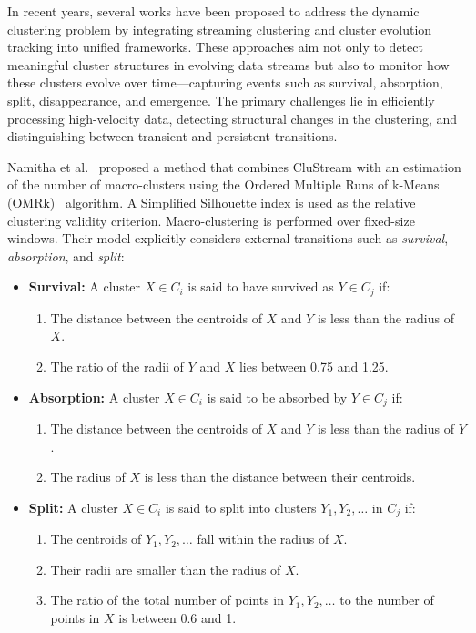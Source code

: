 In recent years, several works have been proposed to address the dynamic
clustering problem by integrating streaming clustering and cluster evolution
tracking into unified frameworks. These approaches aim not only to detect
meaningful cluster structures in evolving data streams but also to monitor how
these clusters evolve over time—capturing events such as survival, absorption,
split, disappearance, and emergence. The primary challenges lie in efficiently
processing high-velocity data, detecting structural changes in the clustering,
and distinguishing between transient and persistent transitions.

Namitha et al.~\cite{namitha_dynamic_clustering_1} proposed a method that
combines CluStream with an estimation of the number of macro-clusters using the
Ordered Multiple Runs of k-Means (OMRk)~\cite{omrk} algorithm. A Simplified Silhouette
index is used as the relative clustering validity criterion. Macro-clustering
is performed over fixed-size windows. Their model explicitly considers external
transitions such as \textit{survival}, \textit{absorption}, and \textit{split}:

\begin{itemize}
    \item \textbf{Survival:} A cluster $X \in C_i$ is said to have survived as $Y \in C_j$ if:
          \begin{enumerate}
              \item The distance between the centroids of $X$ and $Y$ is less than the radius of
                    $X$.
              \item The ratio of the radii of $Y$ and $X$ lies between 0.75 and 1.25.
          \end{enumerate}

    \item \textbf{Absorption:} A cluster $X \in C_i$ is said to be absorbed by $Y \in C_j$ if:
          \begin{enumerate}
              \item The distance between the centroids of $X$ and $Y$ is less than the radius of
                    $Y$.
              \item The radius of $X$ is less than the distance between their centroids.
          \end{enumerate}

    \item \textbf{Split:} A cluster $X \in C_i$ is said to split into clusters $Y_1, Y_2, \dots$ in $C_j$ if:
          \begin{enumerate}
              \item The centroids of $Y_1, Y_2, \dots$ fall within the radius of $X$.
              \item Their radii are smaller than the radius of $X$.
              \item The ratio of the total number of points in $Y_1, Y_2, \dots$ to the number of
                    points in $X$ is between 0.6 and 1.
          \end{enumerate}
\end{itemize}

